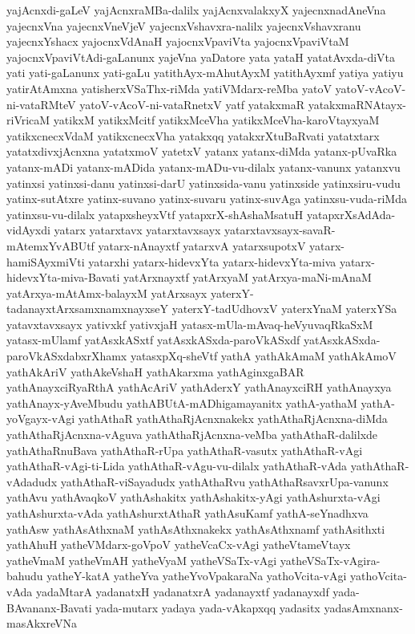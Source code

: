 {yajAcnxdi-gaLeV
yajAcnxraMBa-dalilx
yajAcnxvalakxyX
yajecnxnadAneVna
yajecnxVna
yajecnxVneVjeV
yajecnxVshavxra-nalilx
yajecnxVshavxranu
yajecnxYshacx
yajocnxVdAnaH
yajocnxVpaviVta
yajocnxVpaviVtaM
yajocnxVpaviVtAdi-gaLanunx
yajeVna
yaDatore
yata
yataH
yatatAvxda-diVta
yati
yati-gaLanunx
yati-gaLu
yatithAyx-mAhutAyxM
yatithAyxmf
yatiya
yatiyu
yatirAtAmxna
yatisherxVSaThx-riMda
yatiVMdarx-reMba
yatoV
yatoV-vAcoV-ni-vataRMteV
yatoV-vAcoV-ni-vataRnetxV
yatf
yatakxmaR
yatakxmaRNAtayx-riVricaM
yatikxM
yatikxMcitf
yatikxMceVha
yatikxMceVha-karoVtayxyaM
yatikxcnecxVdaM
yatikxcnecxVha
yatakxqq
yatakxrXtuBaRvati
yatatxtarx
yatatxdivxjAcnxna
yatatxmoV
yatetxV
yatanx
yatanx-diMda
yatanx-pUvaRka
yatanx-mADi
yatanx-mADida
yatanx-mADu-vu-dilalx
yatanx-vanunx
yatanxvu
yatinxsi
yatinxsi-danu
yatinxsi-darU
yatinxsida-vanu
yatinxside
yatinxsiru-vudu
yatinx-sutAtxre
yatinx-suvano
yatinx-suvaru
yatinx-suvAga
yatinxsu-vuda-riMda
yatinxsu-vu-dilalx
yatapxsheyxVtf
yatapxrX-shAshaMsatuH
yatapxrXsAdAda-vidAyxdi
yatarx
yatarxtavx
yatarxtavxsayx
yatarxtavxsayx-savaR-mAtemxYvABUtf
yatarx-nAnayxtf
yatarxvA
yatarxsupotxV
yatarx-hamiSAyxmiVti
yatarxhi
yatarx-hidevxYta
yatarx-hidevxYta-miva
yatarx-hidevxYta-miva-Bavati
yatArxnayxtf
yatArxyaM
yatArxya-maNi-mAnaM
yatArxya-mAtAmx-balayxM
yatArxsayx
yaterxY-tadanayxtArxsamxnamxnayxseY
yaterxY-tadUdhovxV
yaterxYnaM
yaterxYSa
yatavxtavxsayx
yativxkf
yativxjaH
yatasx-mUla-mAvaq-heVyuvaqRkaSxM
yatasx-mUlamf
yatAsxkASxtf
yatAsxkASxda-paroVkASxdf
yatAsxkASxda-paroVkASxdabxrXhamx
yatasxpXq-sheVtf
yathA
yathAkAmaM
yathAkAmoV
yathAkAriV
yathAkeVshaH
yathAkarxma
yathAginxgaBAR
yathAnayxciRyaRthA
yathAcAriV
yathAderxY
yathAnayxciRH
yathAnayxya
yathAnayx-yAveMbudu
yathABUtA-mADhigamayanitx
yathA-yathaM
yathA-yoVgayx-vAgi
yathAthaR
yathAthaRjAcnxnakekx
yathAthaRjAcnxna-diMda
yathAthaRjAcnxna-vAguva
yathAthaRjAcnxna-veMba
yathAthaR-dalilxde
yathAthaRnuBava
yathAthaR-rUpa
yathAthaR-vasutx
yathAthaR-vAgi
yathAthaR-vAgi-ti-Lida
yathAthaR-vAgu-vu-dilalx
yathAthaR-vAda
yathAthaR-vAdadudx
yathAthaR-viSayadudx
yathAthaRvu
yathAthaRsavxrUpa-vanunx
yathAvu
yathAvaqkoV
yathAshakitx
yathAshakitx-yAgi
yathAshurxta-vAgi
yathAshurxta-vAda
yathAshurxtAthaR
yathAsuKamf
yathA-seYnadhxva
yathAsw
yathAsAthxnaM
yathAsAthxnakekx
yathAsAthxnamf
yathAsithxti
yathAhuH
yatheVMdarx-goVpoV
yatheVcaCx-vAgi
yatheVtameVtayx
yatheVmaM
yatheVmAH
yatheVyaM
yatheVSaTx-vAgi
yatheVSaTx-vAgira-bahudu
yatheY-katA
yatheYva
yatheYvoVpakaraNa
yathoVcita-vAgi
yathoVcita-vAda
yadaMtarA
yadanatxH
yadanatxrA
yadanayxtf
yadanayxdf
yada-BAvananx-Bavati
yada-mutarx
yadaya
yada-vAkapxqq
yadasitx
yadasAmxnanx-masAkxreVNa
}
